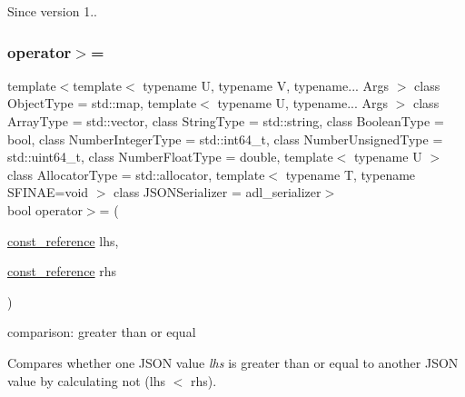\begin{DoxySince}{Since}
version 1.. 
\end{DoxySince}
\mbox{\label{classnlohmann_1_1basic__json_a74a943800c7f103d0990d7eef82c6453}} 
\subsubsection{\texorpdfstring{operator$>$=}{operator>=}}
{\footnotesize\ttfamily template$<$template$<$ typename U, typename V, typename... Args $>$ class Object\+Type = std\+::map, template$<$ typename U, typename... Args $>$ class Array\+Type = std\+::vector, class String\+Type  = std\+::string, class Boolean\+Type  = bool, class Number\+Integer\+Type  = std\+::int64\+\_\+t, class Number\+Unsigned\+Type  = std\+::uint64\+\_\+t, class Number\+Float\+Type  = double, template$<$ typename U $>$ class Allocator\+Type = std\+::allocator, template$<$ typename T, typename S\+F\+I\+N\+A\+E=void $>$ class J\+S\+O\+N\+Serializer = adl\+\_\+serializer$>$ \\
bool operator$>$= (\begin{DoxyParamCaption}\item[{\mbox{\hyperlink{classnlohmann_1_1basic__json_a4057c5425f4faacfe39a8046871786ca}{const\+\_\+reference}}}]{lhs,  }\item[{\mbox{\hyperlink{classnlohmann_1_1basic__json_a4057c5425f4faacfe39a8046871786ca}{const\+\_\+reference}}}]{rhs }\end{DoxyParamCaption})\hspace{0.3cm}{\ttfamily [friend]}}



comparison\+: greater than or equal 

Compares whether one J\+S\+ON value {\itshape lhs} is greater than or equal to another J\+S\+ON value by calculating {\ttfamily not (lhs $<$ rhs)}.


